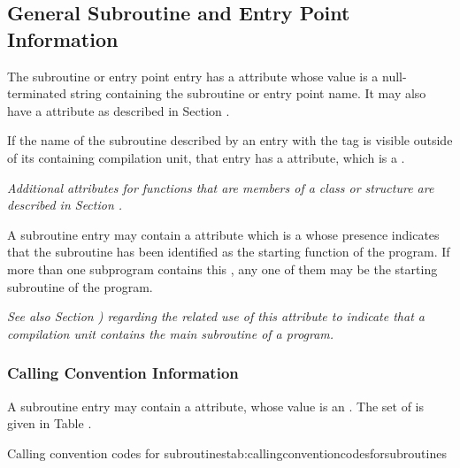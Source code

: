 \subsection{General Subroutine and Entry Point Information}
\label{chap:generalsubroutineandentrypointinformation}
The subroutine or entry point entry has a \DWATname{} 
attribute whose value is a null-terminated string containing the 
subroutine or entry point name.
It may also have a \DWATlinkagename{} attribute as
described in Section .

If the name of the subroutine described by an entry with the
tag \DWTAGsubprogram{}\hypertarget{chap:DWATexternalexternalsubroutine}{}
is visible outside of its containing
compilation unit, that entry has a 
\DWATexternalDEFN{} attribute,
which is a .

\textit{Additional attributes for functions that are members of a
class or structure are described in 
Section .
}

A\hypertarget{chap:DWATmainsubprogrammainorstartingsubprogram}{}
subroutine entry may contain a 
\DWATmainsubprogramDEFN{} attribute 
which is 
a \CLASSflag{} whose presence indicates that the
subroutine has been identified as the starting function of
the program.  If more than one subprogram contains this 
,
any one of them may be the starting subroutine of the program.

\textit{See also Section ) regarding the
related use of this attribute to indicate that a compilation
unit contains the main subroutine of a program.}

\subsubsection{Calling Convention Information}
\hypertarget{chap:DWATcallingconventionforsubprograms}{}
A subroutine entry may contain a 
\DWATcallingconventionDEFN{}
attribute, whose value is an 
. The set of
is given in Table .

\begin{simplenametable}[1.4in]{Calling convention codes for subroutines}{tab:callingconventioncodesforsubroutines}
\DWCCnormal        \\
\DWCCprogram       \\
\DWCCnocall        \\
\end{simplenametable}

